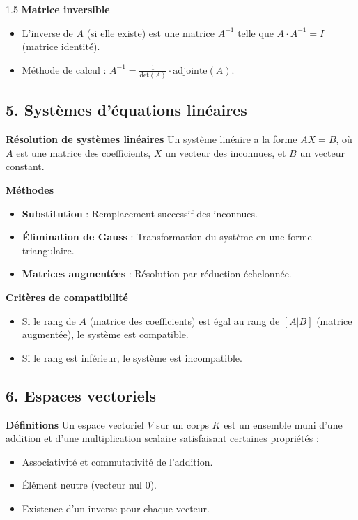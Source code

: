 \documentclass[12pt]{article}
\begin{document}
\begin{spacing}{1.5}
\textbf{Matrice inversible}
\begin{itemize}
    \item L'inverse de $A$ (si elle existe) est une matrice $A^{-1}$ telle que $A \cdot A^{-1} = I$ (matrice identité).
    \item Méthode de calcul : $A^{-1} = \frac{1}{\text{det}(A)} \cdot \text{adjointe}(A)$.
\end{itemize}

\subsection*{5. Systèmes d'équations linéaires}
\textbf{Résolution de systèmes linéaires}
Un système linéaire a la forme $AX = B$, où $A$ est une matrice des coefficients, $X$ un vecteur des inconnues, et $B$ un vecteur constant.

\textbf{Méthodes}

\begin{itemize}
    \item \textbf{Substitution} : Remplacement successif des inconnues.
    \item \textbf{Élimination de Gauss} : Transformation du système en une forme triangulaire.
    \item \textbf{Matrices augmentées} : Résolution par réduction échelonnée.
\end{itemize}

\textbf{Critères de compatibilité}
\begin{itemize}
    \item Si le rang de $A$ (matrice des coefficients) est égal au rang de $[A|B]$ (matrice augmentée), le système est compatible.
    \item Si le rang est inférieur, le système est incompatible.
\end{itemize}

\subsection*{6. Espaces vectoriels}

\textbf{Définitions}
Un espace vectoriel $V$ sur un corps $K$ est un ensemble muni d'une addition et d'une multiplication scalaire satisfaisant certaines propriétés :

\begin{itemize}
    \item Associativité et commutativité de l'addition.
    \item Élément neutre (vecteur nul $0$).
    \item Existence d'un inverse pour chaque vecteur.
\end{itemize}


\end{spacing}
\end{document}
